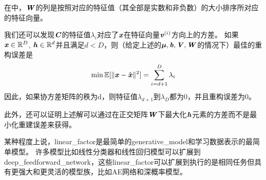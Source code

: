 在中，$\boldsymbol{\mathit{W}}$的列是按照对应的特征值（其全部是实数和非负数）的大小排序所对应的特征向量。

我们还可以发现$\boldsymbol{\mathit{C}}$的特征值$\lambda_i$对应了$\boldsymbol{\mathit{x}}$在特征向量$\boldsymbol{\mathit{v}}^{(i)}$方向上的方差。
如果$\boldsymbol{\mathit{x}}\in \mathbb{R}^D$, $\boldsymbol{\mathit{h}}\in\mathbb{R}^d$并且满足$d<D$，则（给定上述的${\boldsymbol{\mu}},\boldsymbol{\mathit{b}},\boldsymbol{\mathit{V}},\boldsymbol{\mathit{W}}$的情况下）最佳的重构误差是
\begin{align}
\label{eqn:1323}
\min \mathbb{E}[\Vert \boldsymbol{\mathit{x}} - \hat{\boldsymbol{\mathit{x}}} \Vert^2]
 = \sum_{i=d+1}^{D}\lambda_i
\end{align}
因此，如果协方差矩阵的秩为d，则特征值$\lambda_{d+1}$到$\lambda_{D}$都为0，并且重构误差为0。

此外，还可以证明上述解可以通过在正交矩阵$\boldsymbol{\mathit{W}}$下最大化$\boldsymbol{\mathit{h}}$元素的方差而不是最小化重建误差来获得。


某种程度上说，\gls{linear_factor}是最简单的\gls{generative_model}和学习数据表示的最简单模型。
许多模型比如线性分类器和线性回归模型可以扩展到\gls{deep_feedforward_network}，这些\gls{linear_factor}可以扩展到执行的是相同任务但具有更强大和更灵活的模型族，比如\gls{AE}网络和深概率模型。














